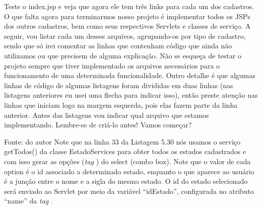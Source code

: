 
Teste o index.jsp e veja que agora ele tem três links para cada um dos cadastros. O que falta agora para terminarmos nosso projeto é implementar todos os JSPs dos outros cadastros, bem como seus respectivos Servlets e classes de serviço. A seguir, vou listar cada um desses arquivos, agrupando-os por tipo de cadastro, sendo que só irei comentar as linhas que contenham código que ainda não utilizamos ou que precisem de alguma explicação. Não se esqueça de testar o projeto sempre que tiver implementado os arquivos necessários para o funcionamento de uma determinada funcionalidade. Outro detalhe é que algumas linhas de código de algumas listagens foram divididas em duas linhas (nas listagens anteriores eu usei uma flecha para indicar isso), então preste atenção nas linhas que iniciam logo na margem esquerda, pois elas fazem parte da linha anterior. Antes das listagens vou indicar qual arquivo que estamos implementando. Lembre-se de criá-lo antes! Vamos começar?

 

 
Fonte: do autor
Note que na linha 33 da Listagem 5.30 nós usamos o serviço getTodos() da classe EstadoServices para obter todos os estados cadastrados e com isso gerar as opções (\textit{tag} ) do select (combo box). Note que o valor de cada option é o id associado a determinado estado, enquanto o que aparece ao usuário é a junção entre o nome e a sigla do mesmo estado. O id do estado selecionado será enviado ao Servlet por meio da variável ``idEstado'', configurada no atributo ``name'' da \textit{tag} .

